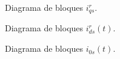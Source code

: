 \documentclass[a4paper, 10pt, onecolumn,journal]{ieeeconf}
\begin{document}
\begin{figure}[H]
    \centering
    \begin{adjustbox}{scale=0.7,max width=\columnwidth}
    \end{adjustbox}
    \caption{Diagrama de bloques $i^r_{qs}$.}
    \label{diagrama de bloques I_qs}
\end{figure}

\begin{figure}[H]
    \centering
    \begin{adjustbox}{max width=\columnwidth}
    \end{adjustbox}
    \caption{Diagrama de bloques $i^r_{ds}(t)$.}
    \label{diagrama de bloques I_ds}
\end{figure}

\begin{figure}[H]
    \centering
    \begin{adjustbox}{max width=\columnwidth}
    \end{adjustbox}
    \caption{Diagrama de bloques $i_{0s}(t)$.}
    \label{diagrama de bloques I_0s}
\end{figure}
\end{document}
